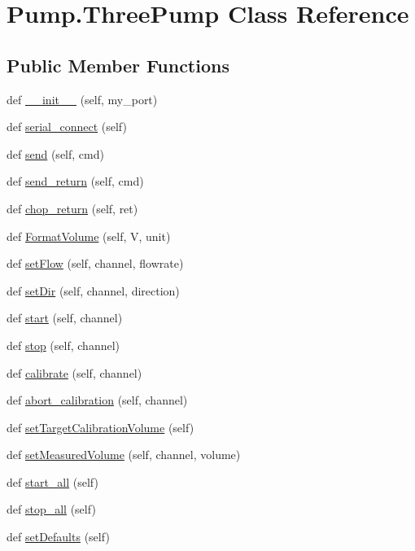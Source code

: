 \hypertarget{class_pump_1_1_three_pump}{}\section{Pump.\+Three\+Pump Class Reference}
\label{class_pump_1_1_three_pump}
\subsection*{Public Member Functions}
\begin{DoxyCompactItemize}
\item 
def \mbox{\hyperlink{class_pump_1_1_three_pump_a5b920fdc4f8e16fb17dee7ca99586bf9}{\+\_\+\+\_\+init\+\_\+\+\_\+}} (self, my\+\_\+port)
\item 
def \mbox{\hyperlink{class_pump_1_1_three_pump_ab36f024171fea433ea2815b9fdbfcbed}{serial\+\_\+connect}} (self)
\item 
def \mbox{\hyperlink{class_pump_1_1_three_pump_a71d2d68a580ddfb4b4ce7a0fc71f3919}{send}} (self, cmd)
\item 
def \mbox{\hyperlink{class_pump_1_1_three_pump_a89b0e97caf73b7703e377bf4e3800e3b}{send\+\_\+return}} (self, cmd)
\item 
def \mbox{\hyperlink{class_pump_1_1_three_pump_adf760719a9c718d5aec4a70a8c8cab9e}{chop\+\_\+return}} (self, ret)
\item 
def \mbox{\hyperlink{class_pump_1_1_three_pump_addb4b4c6c1259f82c3a7af393719f02e}{Format\+Volume}} (self, V, unit)
\item 
def \mbox{\hyperlink{class_pump_1_1_three_pump_af318067f4573840cdcf5ed34be7c06ee}{set\+Flow}} (self, channel, flowrate)
\item 
def \mbox{\hyperlink{class_pump_1_1_three_pump_a1aaeb98ffd09c015ee68ada56fc76b13}{set\+Dir}} (self, channel, direction)
\item 
def \mbox{\hyperlink{class_pump_1_1_three_pump_aae38b27e57b8ab4b0c93f79cf804fe43}{start}} (self, channel)
\item 
def \mbox{\hyperlink{class_pump_1_1_three_pump_afa6004e95a824a9ce1cc082a821d75a2}{stop}} (self, channel)
\item 
def \mbox{\hyperlink{class_pump_1_1_three_pump_ab85be09529a117c9f2c8160814c31881}{calibrate}} (self, channel)
\item 
def \mbox{\hyperlink{class_pump_1_1_three_pump_a5981418cc8b62f7e47195cb676f4d5e6}{abort\+\_\+calibration}} (self, channel)
\item 
def \mbox{\hyperlink{class_pump_1_1_three_pump_a4dd2281d58ae1b975676270045a6fe04}{set\+Target\+Calibration\+Volume}} (self)
\item 
def \mbox{\hyperlink{class_pump_1_1_three_pump_ab8d0c7431108de453afbc7d61210a521}{set\+Measured\+Volume}} (self, channel, volume)
\item 
def \mbox{\hyperlink{class_pump_1_1_three_pump_ac262d9a7146567c88d307d25f4aadca8}{start\+\_\+all}} (self)
\item 
def \mbox{\hyperlink{class_pump_1_1_three_pump_ad03f8166958397980225c3051c9ce9b3}{stop\+\_\+all}} (self)
\item 
def \mbox{\hyperlink{class_pump_1_1_three_pump_aa8bd3a756f024e4db902de68584ed1ee}{set\+Defaults}} (self)
\end{DoxyCompactItemize}
